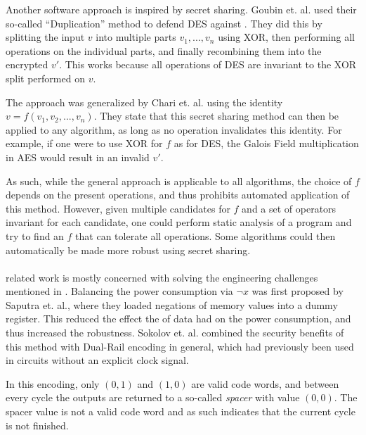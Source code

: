 Another software approach is inspired by secret sharing.
Goubin et. al.\cite{goubin1999and} used their so-called ``Duplication'' method to defend DES against \poweranalysis{}.
They did this by splitting the input $v$ into multiple parts $v_1, ..., v_n$ using XOR, then performing all operations on the individual parts, and finally recombining them into the encrypted $v'$.
This works because all operations of DES are invariant to the XOR split performed on $v$.

The approach was generalized by Chari et. al.\cite{chari1999towards} using the identity $v=f(v_1,v_2,...,v_n)$.
They state that this secret sharing method can then be applied to any algorithm, as long as no operation invalidates this identity.
For example, if one were to use XOR for $f$ as for DES, the Galois Field multiplication in AES would result in an invalid $v'$.

As such, while the general approach is applicable to all algorithms, the choice of $f$ depends on the present operations, and thus prohibits automated application of this method.
However, given multiple candidates for $f$ and a set of operators invariant for each candidate, one could perform static analysis of a program and try to find an $f$ that can tolerate all operations.
Some algorithms could then automatically be made more robust using secret sharing.
\\
\\
\dual{} related work is mostly concerned with solving the engineering challenges mentioned in .
Balancing the power consumption via $\neg{x}$ was first proposed by Saputra et. al.\cite{saputra2003masking}, where they loaded negations of memory values into a dummy register.
This reduced the effect the \hammingw{} of data had on the power consumption, and thus increased the robustness.
Sokolov et. al.\cite{sokolov2005design} combined the security benefits of this method with Dual-Rail encoding in general, which had previously been used in circuits without an explicit clock signal.

In this encoding, only $(0,1)$ and $(1,0)$ are valid code words, and between every cycle the outputs are returned to a so-called \emph{spacer} with value $(0,0)$.
The spacer value is not a valid code word and as such indicates that the current cycle is not finished.

